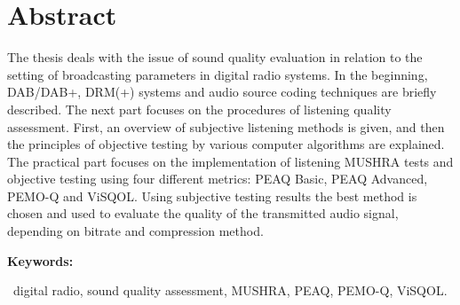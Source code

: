 \chapter*{Abstract}
\label{abstract:english}

The thesis deals with the issue of sound quality evaluation in relation to the setting of broadcasting parameters in digital radio systems. In the beginning, DAB/DAB+, DRM(+) systems and audio source coding techniques are briefly described. The next part focuses on the procedures of listening quality assessment. First, an overview of subjective listening methods is given, and then the principles of objective testing by various computer algorithms are explained. The practical part focuses on the implementation of listening MUSHRA tests and objective testing using four different metrics: PEAQ Basic, PEAQ Advanced, PEMO-Q and ViSQOL. Using subjective testing results the best method is chosen and used to evaluate the quality of the transmitted audio signal, depending on bitrate and compression method.

\bigskip

\noindent\textbf{Keywords:}

~digital radio, sound quality assessment, MUSHRA, PEAQ, PEMO-Q, ViSQOL.

\vfill
